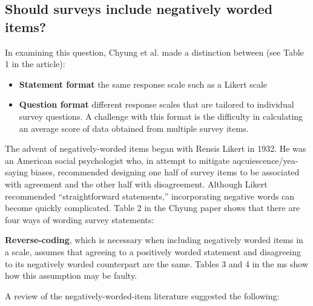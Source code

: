\documentclass[
  english,
]{book}
\providecommand{\tightlist}{%
  \setlength{\itemsep}{0pt}\setlength{\parskip}{0pt}}
\begin{document}
\hypertarget{should-surveys-include-negatively-worded-items}{%
\subsection{Should surveys include negatively worded items?}\label{should-surveys-include-negatively-worded-items}}

In examining this question, Chyung et al. \citep{chyung_evidencebased_2018} made a distinction between (see Table 1 in the article):

\begin{itemize}
\tightlist
\item
  \textbf{Statement format} the same response scale such as a Likert scale
\item
  \textbf{Question format} different response scales that are tailored to individual survey questions. A challenge with this format is the difficulty in calculating an average score of data obtained from multiple survey items.
\end{itemize}

The advent of negatively-worded items began with Rensis Likert in 1932. He was an American social psychologist who, in attempt to mitigate aqcuiescence/yea-saying biases, recommended designing one half of survey items to be associated with agreement and the other half with disagreement. Although Likert recommended ``straightforward statements,'' incorporating negative words can become quickly complicated. Table 2 in the Chyung paper shows that there are four ways of wording survey statements:

\textbf{Reverse-coding}, which is necessary when including negatively worded items in a scale, assumes that agreeing to a positively worded statement and disagreeing to its negatively worded counterpart are the same. Tables 3 and 4 in the ms show how this assumption may be faulty.

A review of the negatively-worded-item literature suggested the following:
\end{document}

